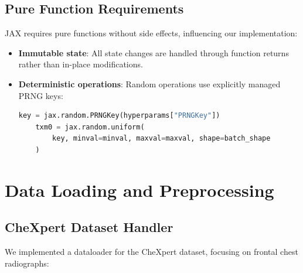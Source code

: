 \documentclass[nomenclature, english, bibtex]{kththesis}
\numberwithin{listing}{chapter}
\begin{document}
\subsection{Pure Function Requirements}
JAX requires pure functions without side effects, influencing our implementation:

\begin{itemize}
    \item \textbf{Immutable state}: All state changes are handled through function returns rather than in-place modifications.
    \item \textbf{Deterministic operations}: Random operations use explicitly managed PRNG keys:
    \begin{lstlisting}[language=Python]
    key = jax.random.PRNGKey(hyperparams["PRNGKey"])
    txm0 = jax.random.uniform(
        key, minval=minval, maxval=maxval, shape=batch_shape
    )
    \end{lstlisting}
\end{itemize}

\section{Data Loading and Preprocessing}
\subsection{CheXpert Dataset Handler}
We implemented a dataloader for the CheXpert dataset, focusing on frontal chest radiographs:
\end{document}
